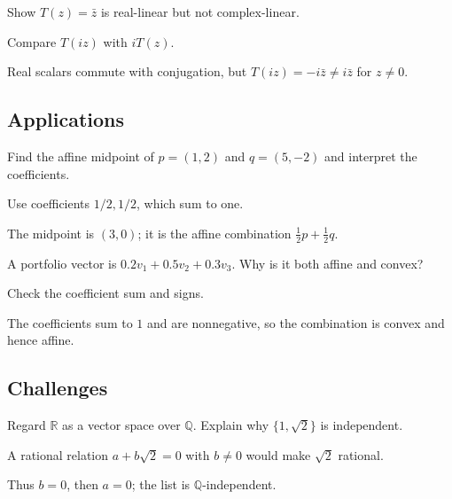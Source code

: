 \begin{exercise}\label{exr:i01-expand-12}
Show \(T(z)=\bar z\) is real-linear but not complex-linear.
\end{exercise}
\begin{hint}
Compare \(T(iz)\) with \(iT(z)\).
\end{hint}
\begin{solution}
Real scalars commute with conjugation, but \(T(iz)=-i\bar z\neq i\bar z\) for \(z\neq0\).
\end{solution}

\subsection*{Applications}

\begin{exercise}\label{exr:i01-expand-13}
Find the affine midpoint of \(p=(1,2)\) and \(q=(5,-2)\) and interpret the coefficients.
\end{exercise}
\begin{hint}
Use coefficients \(1/2,1/2\), which sum to one.
\end{hint}
\begin{solution}
The midpoint is \((3,0)\); it is the affine combination \(\tfrac12p+\tfrac12q\).
\end{solution}

\begin{exercise}\label{exr:i01-expand-14}
A portfolio vector is \(0.2v_1+0.5v_2+0.3v_3\). Why is it both affine and convex?
\end{exercise}
\begin{hint}
Check the coefficient sum and signs.
\end{hint}
\begin{solution}
The coefficients sum to \(1\) and are nonnegative, so the combination is convex and hence affine.
\end{solution}

\subsection*{Challenges}

\begin{exercise}\label{exr:i01-expand-15}
Regard \(\mathbb R\) as a vector space over \(\mathbb Q\). Explain why \(\{1,\sqrt2\}\) is independent.
\end{exercise}
\begin{hint}
A rational relation \(a+b\sqrt2=0\) with \(b\neq0\) would make \(\sqrt2\) rational.
\end{hint}
\begin{solution}
Thus \(b=0\), then \(a=0\); the list is \(\mathbb Q\)-independent.
\end{solution}

